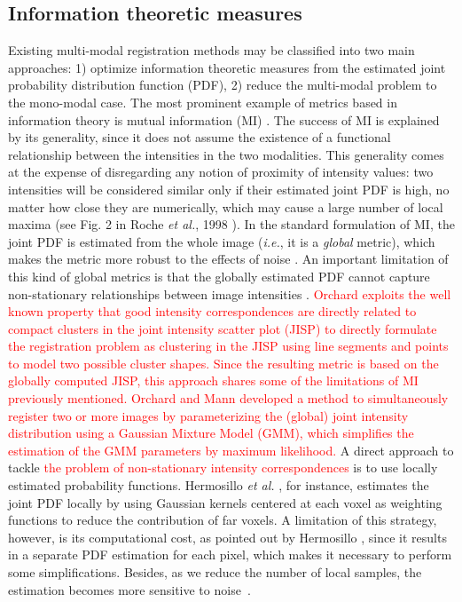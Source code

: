 \subsection{Information theoretic measures}
Existing multi-modal registration methods may be classified into two main approaches: 1) optimize information theoretic measures from the estimated joint probability distribution function (PDF), 2) reduce the multi-modal problem to the mono-modal case. The most prominent example of metrics based in information theory is mutual information (MI) \cite{Maes1997, Mattes2003}. The success of MI is explained by its generality, since it does not assume the existence of a functional relationship between the intensities in the two modalities. This generality comes at the expense of disregarding any notion of proximity of intensity values: two intensities will be considered similar only if their estimated joint PDF is high, no matter how close they are numerically, which may cause a large number of local maxima (see Fig. 2 in Roche {\it et al.}, 1998 \cite{Roche1998}). In the standard formulation of MI, the joint PDF is estimated from the whole image ({\it i.e.}, it is a {\it global} metric), which makes the metric more robust to the effects of noise \cite{Mattes2003}. An important limitation of this kind of global metrics is that the globally estimated PDF cannot capture non-stationary relationships between image intensities \cite{Hermosillo2004}. \textcolor{red}{Orchard \cite{Orchard2008} exploits the well known property that good intensity correspondences are directly related to compact clusters in the joint intensity scatter plot (JISP) \cite{Hermosillo2004}
to directly formulate the registration problem as clustering in the JISP using line segments and points to model two possible cluster shapes. Since the resulting metric is based on the globally computed JISP, this approach shares some of the limitations of MI previously mentioned. Orchard and Mann \cite{Orchard2010} developed a method to simultaneously register two or more images by parameterizing the (global) joint intensity distribution using a Gaussian Mixture Model (GMM), which simplifies the estimation of the GMM parameters by maximum likelihood.} A direct approach to tackle \textcolor{red}{the problem of non-stationary intensity correspondences} is to use locally estimated probability functions. Hermosillo {\it et al.} \cite{Hermosillo2004}, for instance, estimates the joint PDF locally by using Gaussian kernels centered at each voxel as weighting functions to reduce the contribution of far voxels. A limitation of this strategy, however, is its computational cost, as pointed out by Hermosillo \cite{Hermosillo2004}, since it results in a separate PDF estimation for each pixel, which makes it necessary to perform some simplifications. Besides, as we reduce the number of local samples, the estimation becomes more sensitive to noise~\cite{Mattes2003}.

